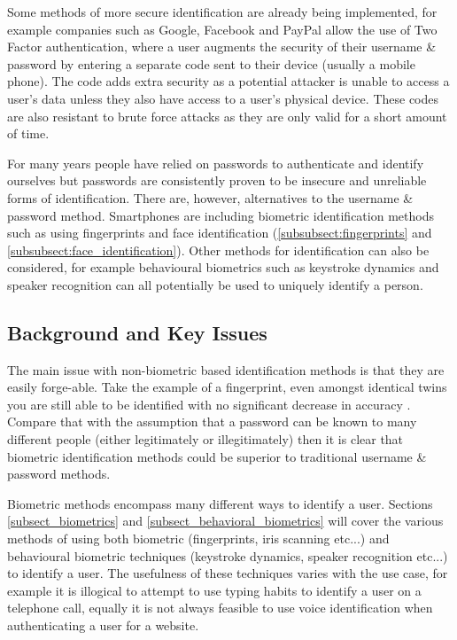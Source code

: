 \documentclass[12pt]{article}
\begin{document}
	Some methods of more secure identification are already being implemented, for example companies such as Google, Facebook and PayPal allow the use of Two Factor authentication, where a user augments the security of their username \& password by entering a separate code sent to their device (usually a mobile phone). The code adds extra security as a potential attacker is unable to access a user's data unless they also have access to a user's physical device. These codes are also resistant to brute force attacks as they are only valid for a short amount of time.
	
	For many years people have relied on passwords to authenticate and identify ourselves but passwords are consistently proven to be insecure and unreliable forms of identification. There are, however, alternatives to the username \& password method. Smartphones are including biometric identification methods such as using fingerprints and face identification (\ref{subsubsect:fingerprints} and \ref{subsubsect:face_identification}). Other methods for identification can also be considered, for example behavioural biometrics such as keystroke dynamics and speaker recognition can all potentially be used to uniquely identify a person.
	
	
	\subsection{Background and Key Issues}
	The main issue with non-biometric based identification methods is that they are easily forge-able. Take the example of a fingerprint, even amongst identical twins you are still able to be identified with no significant decrease in accuracy \citep{han2004study}. Compare that with the assumption that a password can be known to many different people (either legitimately or illegitimately) then it is clear that biometric identification methods could be superior to traditional username \& password methods.
	
	Biometric methods encompass many different ways to identify a user. Sections
	\ref{subsect_biometrics} and \ref{subsect_behavioral_biometrics} will cover the various methods of using both biometric (fingerprints, iris scanning etc...) and behavioural biometric techniques (keystroke dynamics, speaker recognition etc...) to identify a user. The usefulness of these techniques varies with the use case, for example it is illogical to attempt to use typing habits to identify a user on a telephone call, equally it is not always feasible to use voice identification when authenticating a user for a website.
	
\end{document}
